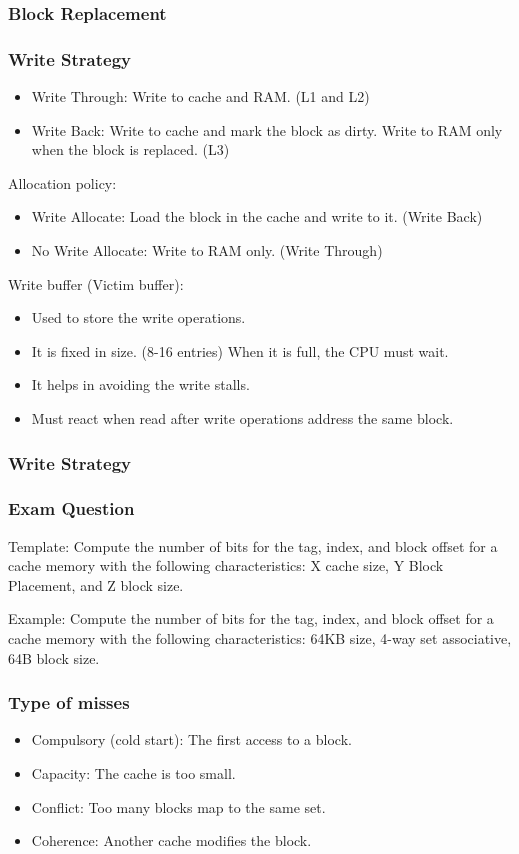 \begin{frame}
    \frametitle{Block Replacement}
\end{frame}

\begin{frame}
    \frametitle{Write Strategy}
    \begin{itemize}
        \item Write Through: Write to cache and RAM. (L1 and L2)
        \item Write Back: Write to cache and mark the block as dirty. Write to RAM only when the block is replaced. (L3)
    \end{itemize}
    Allocation policy:
    \begin{itemize}
        \item Write Allocate: Load the block in the cache and write to it. (Write Back)
        \item No Write Allocate: Write to RAM only. (Write Through)
    \end{itemize}
    Write buffer (Victim buffer):
    \begin{itemize}
        \item Used to store the write operations.
        \item It is fixed in size. (8-16 entries) When it is full, the CPU must wait.
        \item It helps in avoiding the write stalls.
        \item Must react when read after write operations address the same block.
    \end{itemize}
\end{frame}

\begin{frame}
    \frametitle{Write Strategy}
\end{frame}

\begin{frame}
    \frametitle{Exam Question}
    Template: Compute the number of bits for the tag, index, and block offset for a cache memory with the following characteristics: X cache size, Y Block Placement, and Z block size.

    Example: Compute the number of bits for the tag, index, and block offset for a cache memory with the following characteristics: 64KB size, 4-way set associative, 64B block size.
\end{frame}

\begin{frame}
    \frametitle{Type of misses}
    \begin{itemize}
        \item Compulsory (cold start): The first access to a block.
        \item Capacity: The cache is too small.
        \item Conflict: Too many blocks map to the same set.
        \item Coherence: Another cache modifies the block.
    \end{itemize}
    \note{
    }
\end{frame}

